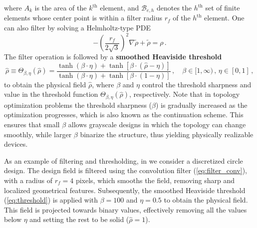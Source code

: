     where $A_k$ is the area of the $k^\text{th}$ element, and $\mathcal{B}_{e, h}$ denotes
    the
   $h^\text{th}$ set of finite elements whose center point is within a filter
    radius $r_f$ of the
   $h^\text{th}$ element. One can also filter by solving a Helmholtz-type
    PDE~\cite{PDE_filter}
       \begin{equation}
    -\left(\frac{r_f}{2 \sqrt{3}}\right)^2 \nabla
    \tilde{\rho}+\tilde{\rho}=\rho\,.
       \end{equation}
    The filter operation is followed by a \textbf{smoothed Heaviside
    threshold}~\cite{projection}
       \begin{equation}\label{eq:threshold}
    \hat{\rho} \equiv \Theta_{\beta,\eta}(\hat{\rho}) =\frac{\tanh (\beta \cdot \eta)+\tanh \left[ \beta
               \cdot(\hat{\rho}-\eta) \right]}{\tanh (\beta \cdot \eta)+\tanh \left[ \beta \cdot(1-\eta) \right]}\,,
    \quad \beta \in[1, \infty)\,,\, \eta \in[0,1]\,,
       \end{equation}
    to obtain the physical field $\hat{\rho}$, where $\beta$ and $\eta$ control the threshold sharpness and value in the 
    threshold function $\Theta_{\beta,\eta}(\hat{\rho})$,
    respectively. Note that in topology optimization problems the threshold sharpness ($\beta$) is gradually increased as the optimization progresses, which is also known as 
    the continuation scheme. This ensures that
    small $\beta$ allows grayscale designs in which the topology can change smoothly, while larger
       $\beta$ binarize the structure, thus yielding physically realizable devices.
       
    As an example of filtering and thresholding, in 
        we consider a discretized circle design.
    The design field is filtered using the convolution filter (\eqref{eq:filter_conv}), with a radius of $r_f=4$ pixels, which smooths the field, removing sharp and localized
    geometrical features. Subsequently, the smoothed Heaviside threshold (\eqref{eq:threshold}) is applied with $\beta=100$ and $\eta=0.5$ to obtain the physical field. This field is projected towards binary 
    values, effectively removing all the values below $\eta$ and setting the rest to be solid ($\hat{\rho}=1$).
   
